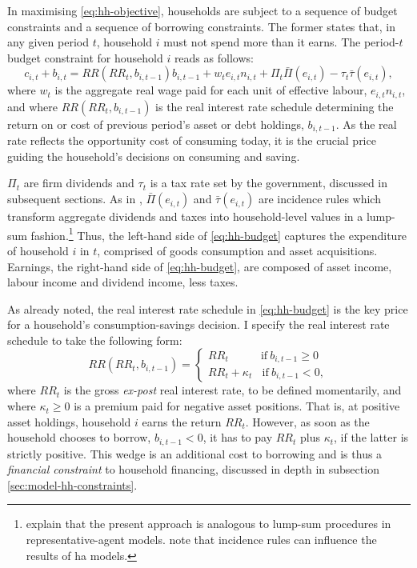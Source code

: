 \documentclass[a4paper,12pt]{article} %
\numberwithin{equation}{section} %
\numberwithin{figure}{section}
\numberwithin{table}{section}
\begin{document}
In maximising \eqref{eq:hh-objective}, households are subject to a sequence of budget constraints and a sequence of borrowing constraints. The former states that, in any given period $t$, household $i$ must not spend more than it earns. The period-$t$ budget constraint for household $i$ reads as follows: 
\begin{equation}
c_{i,t} + b_{i,t} = RR (RR_t, b_{i,t-1}) b_{i,t-1} + w_t e_{i,t} n_{i,t} + \Pi_t \bar{\Pi} (e_{i,t}) - \tau_t \bar{\tau} (e_{i,t}), \label{eq:hh-budget}
\end{equation}
where $w_t$ is the aggregate real wage paid for each unit of effective labour, $e_{i,t} n_{i,t}$, and where $RR (RR_t, b_{i,t-1})$ is the real interest rate schedule determining the return on or cost of previous period's asset or debt holdings, $b_{i,t-1}$. As the real rate reflects the opportunity cost of consuming today, it is the crucial price guiding the household's decisions on consuming and saving. 

$\Pi_t$ are firm dividends and $\tau_t$ is a tax rate set by the government, discussed in subsequent sections. As in \textcite{mckay2016}, $\bar{\Pi} (e_{i,t})$ and $\bar{\tau} (e_{i,t})$ are incidence rules which transform aggregate dividends and taxes into household-level values in a lump-sum fashion.\footnote{\textcite{mckay2016} explain that the present approach is analogous to lump-sum procedures in representative-agent models. \textcite{kaplan2018} note that incidence rules can influence the results of \Gls{ha} models.} Thus, the left-hand side of \eqref{eq:hh-budget} captures the expenditure of household $i$ in $t$, comprised of goods consumption and asset acquisitions. Earnings, the right-hand side of \eqref{eq:hh-budget}, are composed of asset income, labour income and dividend income, less taxes.

As already noted, the real interest rate schedule in \eqref{eq:hh-budget} is the key price for a household's consumption-savings decision. I specify the real interest rate schedule to take the following form:
\begin{equation}
    RR (RR_t, b_{i,t-1}) = \begin{cases}
	RR_t \ \ \ \ \ \ \ \ \ \ \ \ \ \text{if} \ b_{i,t-1} \ge 0 \\
	RR_t + \kappa_t \ \ \ \ \text{if} \ b_{i,t-1} < 0,
	\end{cases} \label{eq:hh-interest-rate-wedge}
\end{equation}
where $RR_t$ is the gross \textit{ex-post} real interest rate, to be defined momentarily, and where $\kappa_t \ge 0$ is a premium paid for negative asset positions. That is, at positive asset holdings, household $i$ earns the return $RR_t$. However, as soon as the household chooses to borrow, $b_{i,t-1} < 0$, it has to pay $RR_t$ plus $\kappa_t$, if the latter is strictly positive. This wedge is an additional cost to borrowing and is thus a \textit{financial constraint} to household financing, discussed in depth in subsection \ref{sec:model-hh-constraints}.
\end{document}
